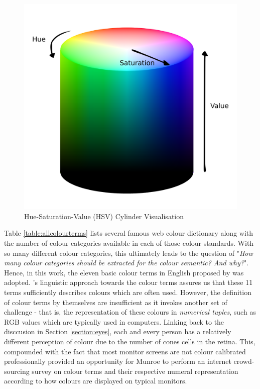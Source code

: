 \begin{figure}[hbt!]\centering
\includegraphics[width=.5\textwidth]{image/general/HSV.png}
\caption{Hue-Saturation-Value (HSV) Cylinder Visualisation}
\label{fig:hsvcylinder}
\end{figure}

Table \ref{table:allcolourterms} lists several famous web colour dictionary along with the number of colour categories available in each of those colour standards. With so many different colour categories, this ultimately leads to the question of "\textit{How many colour categories should be extracted for the colour semantic? And why?}".
Hence, in this work, the eleven basic colour terms in English proposed by \cite{berlinandkay} was adopted.
's linguistic approach towards the colour terms assures us that these 11 terms sufficiently describes colours which are often used.
However, the definition of colour terms by themselves are insufficient as it invokes another set of challenge - that is, the representation of these colours in \textit{numerical tuples}, such as RGB values which are typically used in computers.
Linking back to the disccusion in Section \ref{section:eyes}, each and every person has a relatively different perception of colour due to the number of cones cells in the retina. This, compounded with the fact that most monitor screens are not colour calibrated professionally provided an opportunity for Munroe \cite{munroe2010color} to perform an internet crowd-sourcing survey on colour terms and their respective numeral representation according to how colours are displayed on typical monitors.

